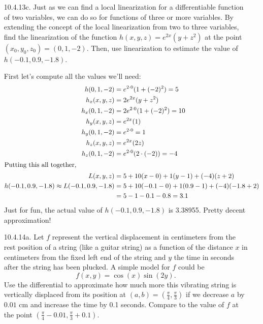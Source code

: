 \begin{enumerate}[leftmargin=0pt]
        \item[10.4.13c.] Just as we can find a local linearization for a differentiable function of two variables, we can do so for functions of three or more variables. By extending the concept of the local linearization from two to three variables, find the linearization of the function $h(x,y,z) = e^{2x}(y+z^2)$ at the point $(x_0,y_0,z_0) = (0, 1, -2)$. Then, use linearization to estimate the value of $h(-0.1, 0.9, -1.8)$.
        
        \begin{red}
        First let's compute all the values we'll need:
        \begin{align*}
            h(0, 1, -2) &= e^{2\cdot 0}(1 + (-2)^2) = 5 \\
            h_x(x,y,z) &= 2 e^{2x}(y + z^2) \\
            h_x(0, 1, -2) & =2 e^{2\cdot 0}(1 + (-2)^2) = 10 \\
            h_y(x,y,z) &= e^{2x}(1) \\
            h_y(0, 1, -2) &= e^{2\cdot 0} = 1 \\
            h_z(x,y,z) &= e^{2x}(2z) \\
            h_z(0, 1, -2) &= e^{2\cdot 0} (2\cdot(-2)) = -4 \\
            \intertext{Putting this all together,}
            L(x,y,z) &= 5 + 10(x-0) + 1(y-1) + (-4)(z + 2) \\
            h(-0.1, 0.9, -1.8) \approx 
            L(-0.1, 0.9, -1.8) &= 5 + 10(-0.1 - 0) + 1(0.9-1)+(-4)(-1.8 + 2) \\
            &= 5  -1 -0.1 -0.8 = 3.1
        \end{align*}
        Just for fun, the actual value of $h(-0.1, 0.9, -1.8)$ is 3.38955. Pretty decent approximation!
        \end{red}
    
    
\item[10.4.14a.] Let $f$ represent the vertical displacement in centimeters from the rest position of a string (like a guitar string) as a function of the distance $x$ in centimeters from the fixed left end of the string and $y$ the time in seconds after the string has been plucked. A simple model for $f$ could be \[f(x, y) = \cos(x)\sin(2y).\]
Use the differential to approximate how much more this vibrating string is vertically displaced from its position at $(a,b) = \left(\tfrac{\pi}{4}, \tfrac{\pi}{3}\right)$ if we decrease $a$ by $0.01$ cm and increase the time by 0.1 seconds. Compare to the value of $f$ at the point $\left(\tfrac{\pi}{4}-0.01, \tfrac{\pi}{3}+0.1\right)$.
        

\end{enumerate}
